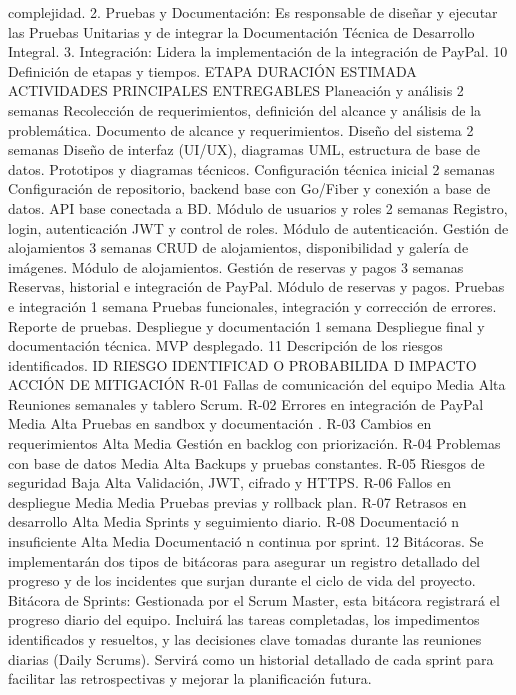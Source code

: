 complejidad.
2. Pruebas y Documentación: Es responsable de
diseñar y ejecutar las Pruebas Unitarias y de
integrar la Documentación Técnica de Desarrollo
Integral.
3. Integración: Lidera la implementación de la
integración de PayPal.
10
Definición de etapas y tiempos.
ETAPA DURACIÓN
ESTIMADA
ACTIVIDADES
PRINCIPALES
ENTREGABLES
Planeación y
análisis
2 semanas Recolección de
requerimientos,
definición del
alcance y análisis
de la problemática.
Documento de
alcance y
requerimientos.
Diseño del sistema 2 semanas Diseño de interfaz
(UI/UX), diagramas
UML, estructura de
base de datos.
Prototipos y
diagramas
técnicos.
Configuración
técnica inicial
2 semanas Configuración de
repositorio,
backend base con
Go/Fiber y
conexión a base de
datos.
API base
conectada a BD.
Módulo de usuarios
y roles
2 semanas Registro, login,
autenticación JWT
y control de roles.
Módulo de
autenticación.
Gestión de
alojamientos
3 semanas CRUD de
alojamientos,
disponibilidad y
galería de
imágenes.
Módulo de
alojamientos.
Gestión de
reservas y pagos
3 semanas Reservas, historial
e integración de
PayPal.
Módulo de reservas
y pagos.
Pruebas e
integración
1 semana Pruebas
funcionales,
integración y
corrección de
errores.
Reporte de
pruebas.
Despliegue y
documentación
1 semana Despliegue final y
documentación
técnica.
MVP desplegado.
11
Descripción de los riesgos identificados.
ID RIESGO
IDENTIFICAD
O
PROBABILIDA
D
IMPACTO ACCIÓN DE
MITIGACIÓN
R-01 Fallas de
comunicación
del equipo
Media Alta Reuniones
semanales y
tablero Scrum.
R-02 Errores en
integración de
PayPal
Media Alta Pruebas en
sandbox y
documentación
.
R-03 Cambios en
requerimientos
Alta Media Gestión en
backlog con
priorización.
R-04 Problemas con
base de datos
Media Alta Backups y
pruebas
constantes.
R-05 Riesgos de
seguridad
Baja Alta Validación,
JWT, cifrado y
HTTPS.
R-06 Fallos en
despliegue
Media Media Pruebas
previas y
rollback plan.
R-07 Retrasos en
desarrollo
Alta Media Sprints y
seguimiento
diario.
R-08 Documentació
n insuficiente
Alta Media Documentació
n continua por
sprint.
12
Bitácoras.
Se implementarán dos tipos de bitácoras para asegurar un registro detallado del
progreso y de los incidentes que surjan durante el ciclo de vida del proyecto.
Bitácora de Sprints: Gestionada por el Scrum Master, esta bitácora registrará el
progreso diario del equipo. Incluirá las tareas completadas, los impedimentos
identificados y resueltos, y las decisiones clave tomadas durante las reuniones
diarias (Daily Scrums). Servirá como un historial detallado de cada sprint para
facilitar las retrospectivas y mejorar la planificación futura.
